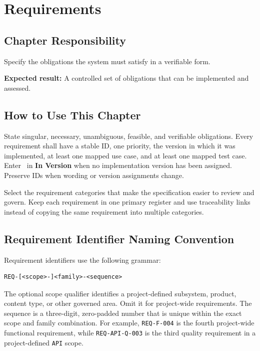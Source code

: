 \chapter{Requirements}

\section{Chapter Responsibility}
\label{Section:RequirementsResponsibility}
Specify the obligations the system must satisfy in a verifiable form.

\noindent\textbf{Expected result:} A controlled set of obligations that can be implemented and assessed.

\section{How to Use This Chapter}
State singular, necessary, unambiguous, feasible, and verifiable obligations.
Every requirement shall have a stable ID, one priority, the version in which it
was implemented, at least one mapped use case, and at least one mapped test case.
Enter \NoVersion\ in \textbf{In Version} when no implementation version has
been assigned. Preserve IDs when wording or version assignments change.

Select the requirement categories that make the specification easier to review
and govern. Keep each requirement in one primary register and use traceability
links instead of copying the same requirement into multiple categories.

\section{Requirement Identifier Naming Convention}
\label{Section:RequirementIdentifierConvention}

Requirement identifiers use the following grammar:
\begin{verbatim}
REQ-[<scope>-]<family>-<sequence>
\end{verbatim}
The optional scope qualifier identifies a project-defined subsystem, product,
content type, or other governed area. Omit it for project-wide requirements.
The sequence is a three-digit, zero-padded number that is unique within the
exact scope and family combination. For example, \texttt{REQ-F-004} is the
fourth project-wide functional requirement, while
\texttt{REQ-API-Q-003} is the third quality requirement in a project-defined
\texttt{API} scope.

